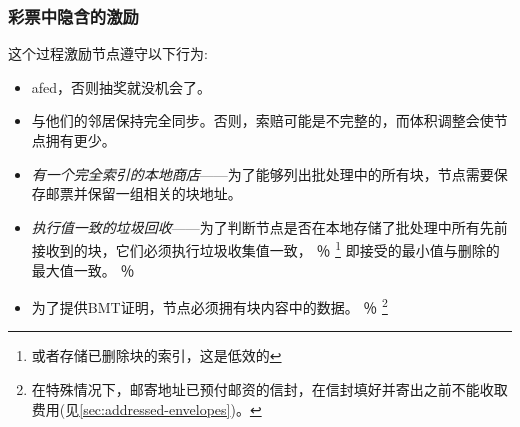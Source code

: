 



\subsubsection{彩票中隐含的激励}

这个过程激励节点遵守以下行为:

\begin{itemize}
\item afed，否则抽奖就没机会了。
\item 与他们的邻居保持完全同步。否则，索赔可能是不完整的，而体积调整会使节点拥有更少。
\item \emph{有一个完全索引的本地商店}——为了能够列出批处理中的所有块，节点需要保存邮票并保留一组相关的块地址。 
\item \emph{执行值一致的垃圾回收}——为了判断节点是否在本地存储了批处理中所有先前接收到的块，它们必须执行垃圾收集值一致，%
％
\footnote{或者存储已删除块的索引，这是低效的}
即接受的最小值与删除的最大值一致。
％
\item 为了提供BMT证明，节点必须拥有块内容中的数据。%
％
\footnote{在特殊情况下，邮寄地址已预付邮资的信封，在信封填好并寄出之前不能收取费用(见\ref{sec:addressed-envelopes})。}
\end{itemize}


